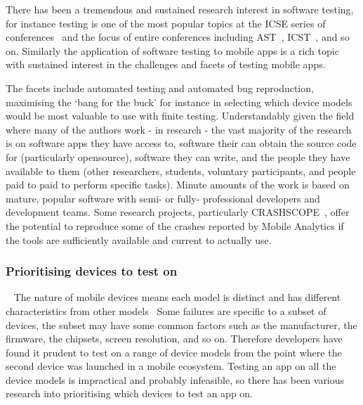 There has been a tremendous and sustained research interest in software testing, for instance testing is one of the most popular topics at the ICSE series of conferences~ and the focus of entire conferences including AST~, ICST~, and so on. Similarly the application of software testing to mobile apps is a rich topic with sustained interest in the challenges and facets of testing mobile apps.

The facets include automated testing and automated bug reproduction, maximising the `bang for the buck' for instance in selecting which device models would be most valuable to use with finite testing. Understandably given the field where many of the authors work - in research - the vast majority of the research is on software apps they have access to, software their can obtain the source code for (particularly opensource), software they can write, and the people they have available to them (other researchers, students, voluntary participants, and people paid to paid to perform specific tasks). Minute amounts of the work is based on mature, popular software with semi- or fully- professional developers and development teams. Some research projects, particularly CRASHSCOPE~, offer the potential to reproduce some of the crashes reported by Mobile Analytics if the tools are sufficiently available and current to actually use.


\subsubsection{Prioritising devices to test on}~\label{rw-prioritising-devices-to-test-on-topic}
The nature of mobile devices means each model is distinct and has different characteristics from other models~ Some failures are specific to a subset of devices, the subset may have some common factors such as the manufacturer, the firmware, the chipsets, screen resolution, and so on. Therefore developers have found it prudent to test on a range of device models from the point where the second device was launched in a mobile ecosystem. Testing an app on all the device models is impractical and probably infeasible, so there has been various research into prioritising which devices to test an app on.

